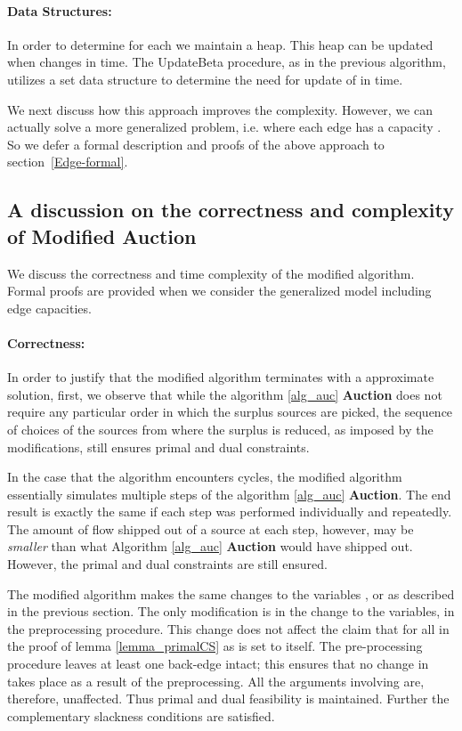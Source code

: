 \documentclass[11pt]{article}
\begin{document}
\paragraph{Data Structures:}
In order to determine  for each  we
maintain a heap. This heap can be updated when  changes in
 time. The UpdateBeta procedure, as in the previous algorithm,
utilizes a set data structure
to determine the need for update of  in  time.


We next discuss how this approach  improves the complexity. However,
we can actually solve a more generalized problem, i.e. where 
each edge  has a capacity .
So we defer a formal description and  proofs of the above approach to
section~\ref{Edge-formal}.






\vspace*{12pt}
\subsection{A discussion on the correctness and complexity of Modified Auction } 

We discuss the correctness and  time complexity of the modified algorithm.
Formal proofs are provided when we consider the generalized model including
edge capacities.

\paragraph{Correctness:}
In order to justify that the modified algorithm 
terminates with a  approximate solution, 
first, we observe that while the algorithm \ref{alg_auc} {\bf Auction} 
does not require any particular order 
in which the surplus sources are picked, the sequence of choices of 
the sources from where the surplus is reduced,  as imposed by 
the modifications, still ensures  primal and dual constraints.

In the case that the algorithm encounters cycles,
the modified algorithm 
essentially simulates multiple steps of the algorithm
\ref{alg_auc} {\bf Auction}. The end result is exactly the same if each step was 
performed individually
and repeatedly. The amount of flow shipped out of a source at each step, however, may be 
{\em smaller} than what Algorithm \ref{alg_auc} {\bf Auction} would have shipped out. 
However, the primal and dual constraints are still ensured.

The modified algorithm makes the same changes to the variables ,
 or  as described in the previous section. 
The only modification is in the change to the  variables,  in the 
preprocessing procedure. This 
change does not affect the claim that  for  all  in the proof
of lemma \ref{lemma_primalCS} as  is set to  itself. 
The pre-processing procedure 
leaves at least one back-edge intact; this ensures that 
no change in  takes place as 
a result of the preprocessing. All the arguments involving  are, therefore, unaffected.
Thus primal and dual feasibility is maintained.
Further the complementary slackness conditions are satisfied.
\end{document}
